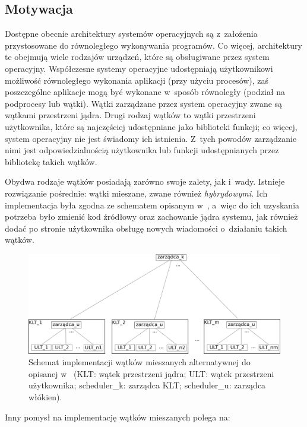 \documentclass[11pt,makeidx]{mwart}
\begin{document}
\subsection{Motywacja}
\indent
	Dostępne obecnie architektury systemów operacyjnych są z~założenia przystosowane do równoległego
	wykonywania programów. Co więcej, architektury te obejmują wiele rodzajów urządzeń, które są obsługiwane przez system operacyjny.
	Współczesne systemy operacyjne udostępniają użytkownikowi możliwość równoległego wykonania aplikacji (przy użyciu procesów),
	zaś poszczególne aplikacje mogą być wykonane w~sposób równoległy (podział na podprocesy lub wątki). Wątki zarządzane przez system operacyjny
	zwane są wątkami przestrzeni jądra.
	Drugi rodzaj wątków to wątki przestrzeni użytkownika, które są najczęściej udostępniane jako biblioteki funkcji; co więcej, system operacyjny
	nie jest świadomy ich istnienia. Z~tych powodów zarządzanie nimi jest odpowiedzialnością użytkownika lub funkcji udostępnianych przez
	bibliotekę takich wątków.
\par
%
\indent
	Obydwa rodzaje wątków posiadają zarówno swoje zalety, jak i~wady. Istnieje rozwiązanie pośrednie: wątki mieszane, zwane również
	\emph{hybrydowymi}.
	Ich implementacja była zgodna ze schematem opisanym w~\cite{anderson}, a~więc do ich uzyskania potrzeba było zmienić kod źródłowy
	oraz zachowanie jądra systemu, jak również dodać po stronie użytkownika obsługę nowych wiadomości o~działaniu takich wątków.
\par
%
\indent
	\begin{figure}[h]
		\label{fig:mixedintro}
		\centering
		\includegraphics[scale=.21]{mixedscheme.png}
		\caption{Schemat implementacji wątków mieszanych alternatywnej do opisanej w~\cite{anderson}
		(KLT: wątek przestrzeni jądra;
			ULT: wątek przestrzeni użytkownika;
			scheduler\_k: zarządca KLT;
			scheduler\_u: zarządca włókien).
		}
	\end{figure}
	Inny pomysł na implementację wątków mieszanych polega na:
\end{document}
